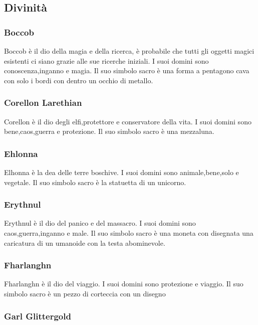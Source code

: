 \documentclass[a4paper,12pt]{book}
\begin{document}
\subsection{Divinità}

\subsubsection{Boccob}

Boccob è il dio della magia e della ricerca, è probabile che tutti gli oggetti magici esistenti ci siano grazie alle sue ricerche iniziali.
I suoi domini sono conoscenza,inganno e magia.
Il suo simbolo sacro è una forma a pentagono cava con solo i bordi con dentro un occhio di metallo.

\subsubsection{Corellon Larethian}

Corellon è il dio degli elfi,protettore e conservatore della vita.
I suoi domini sono bene,caos,guerra e protezione.
Il suo simbolo sacro è una mezzaluna.

\subsubsection{Ehlonna}

Elhonna è la dea delle terre boschive.
I suoi domini sono animale,bene,solo e vegetale.
Il suo simbolo sacro è la statuetta di un unicorno.

\subsubsection{Erythnul}

Erythnul è il dio del panico e del massacro.
I suoi domini sono caos,guerra,inganno e male.
Il suo simbolo sacro è una moneta con disegnata una caricatura di un umanoide con la testa abominevole.

\subsubsection{Fharlanghn}

Fharlanghn è il dio del viaggio.
I suoi domini sono protezione e viaggio.
Il suo simbolo sacro è un pezzo di corteccia con un disegno

\subsubsection{Garl Glittergold}
\end{document}
